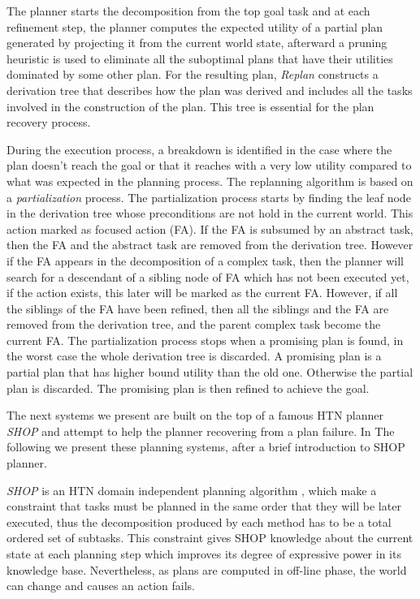 The planner starts the decomposition from the top goal task and at each refinement step, the planner computes the expected utility of a partial plan generated by projecting it from the current world state, afterward a pruning heuristic is used to eliminate all the suboptimal plans that have their utilities dominated by some other plan. For the resulting plan, \textit{Replan} constructs a derivation tree that describes how the plan was derived and includes all the tasks involved in the construction of the plan. This tree is essential for the plan recovery process.

 
During the execution process, a breakdown is identified in the case where the plan doesn't reach the goal or that it reaches with a very low utility compared to what was expected in the planning process.
The replanning algorithm is based on a \textit{partialization} process. The partialization process starts by finding the leaf node in the derivation tree whose preconditions are not hold in the current world. This action marked as focused action (FA). 
If the FA is subsumed by an abstract task, then the FA and the abstract task are removed from the derivation tree. However if the FA appears in the decomposition of a complex task, then the planner will search for a descendant of a sibling node of FA which has not been executed yet, if the action exists, this later will be marked as the current FA. 
However, if all the siblings of the FA have been refined, then all the siblings and the FA are removed from the derivation tree, and the parent complex task become the current FA.
The partialization process stops when a promising plan is found, in the worst case the whole derivation tree is discarded.  A promising plan is a partial plan that has higher bound utility than the old one. Otherwise the partial plan is discarded. The promising plan is then refined to achieve the goal.  


The next systems we present are built on the top of a famous HTN planner \textit{SHOP}\cite{nau1999shop} and attempt to help the planner  recovering from a plan failure. In The following we present these planning systems, after a brief introduction to SHOP planner.


\textit{SHOP} is an HTN domain independent planning algorithm , which make a constraint that tasks must be planned in the same order that they will be later executed, thus the decomposition produced by each method has to be a total ordered set of subtasks. This constraint gives SHOP knowledge about the current state at each planning step which improves its degree of expressive power in its knowledge base. Nevertheless, as plans are computed in off-line phase, the world can change and causes an action fails.

